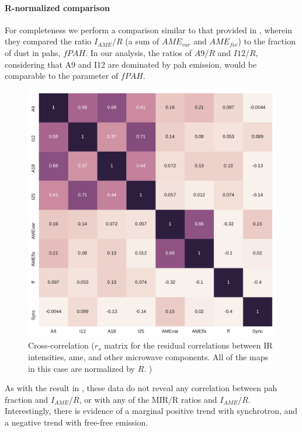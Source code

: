         \paragraph{R-normalized comparison}
            For completeness we perform a comparison similar to that provided in \cite{hensley16}, wherein they compared the ratio $I_{AME}/R$ (a sum of $AME_{var}$ and $AME_{fix}$) to the fraction of dust in \gls{pah}s, $fPAH$. In our analysis, the ratios of $A9/R$ and $I12/R$, considering that A9 and I12 are dominated by \gls{pah} emission, would be comparable to the \cite{hensley16} parameter of $fPAH$.
                \begin{figure}
                    \includegraphics[width=\textwidth/2]{../Plots/ch_allsky/all_bands_corr_matrix_wAME_spearmanR_norm_masked_hens.pdf}
                    \centering
                    \caption{Cross-correlation ($r_{s}$ matrix for the residual correlations between IR intensities, \gls{ame}, and other microwave components. All of the maps in this case are normalized by $R$. )}
                    \label{fig:all_bands_corr_matrix_wAME_spearmanR_norm_masked_hens}
                \end{figure}
            As with the result in \cite{hensley16}, these data do not reveal any correlation between \gls{pah} fraction and $I_{AME}/R$, or with any of the MIR/R ratios and $I_{AME}/R$. Interestingly, there is evidence of a marginal positive trend with synchrotron, and a negative trend with free-free emission.

